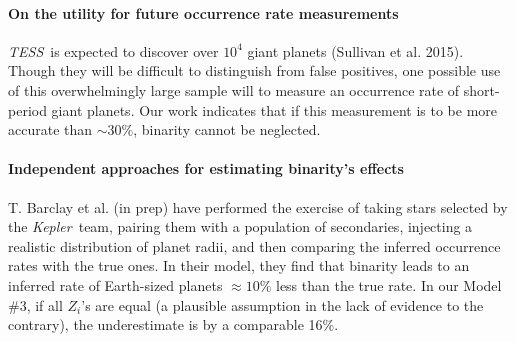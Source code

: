 \paragraph{On the utility for future occurrence rate measurements}
{\it TESS}\ is expected to discover over $10^4$ giant planets (Sullivan 
et al. 2015).
Though they will be difficult to distinguish from false positives, one 
possible use of this overwhelmingly large sample will to measure an
occurrence rate of short-period giant planets.
Our work indicates that if this measurement is to be more accurate than $\sim 
30\%$, binarity cannot be neglected.


\paragraph{Independent approaches for estimating binarity's effects}
T. Barclay et al. (in prep) have performed the exercise of taking stars 
selected by the {\it Kepler}\ team, pairing them with a population of 
secondaries, injecting a realistic distribution of planet radii, 
and then comparing the inferred occurrence rates with the true ones.
In their model, they find that binarity leads to an inferred rate of 
Earth-sized planets $\approx 10\%$ less than the true rate.
In our Model \#3, if all $Z_i$'s are equal (a plausible assumption in 
the lack of evidence to the contrary), the underestimate is by a comparable 
16\%.